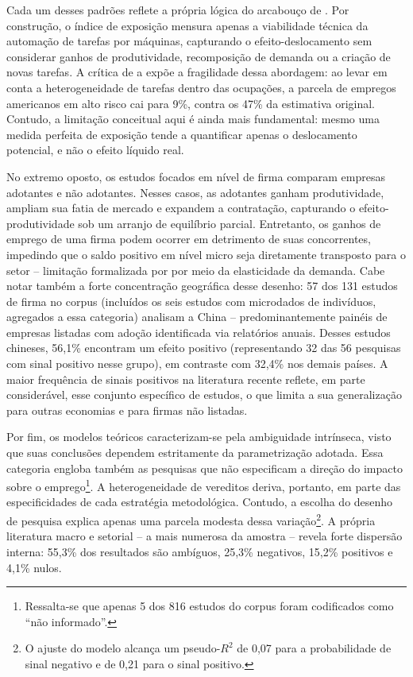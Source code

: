 Cada um desses padrões reflete a própria lógica do arcabouço de \textcite{acemogluRestrepo2019}. Por construção, o índice de exposição mensura apenas a viabilidade técnica da automação de tarefas por máquinas, capturando o efeito-deslocamento sem considerar ganhos de produtividade, recomposição de demanda ou a criação de novas tarefas. A crítica de \textcite{arntzGregoryZierahn2017} a \textcite{frey2017} expõe a fragilidade dessa abordagem: ao levar em conta a heterogeneidade de tarefas dentro das ocupações, a parcela de empregos americanos em alto risco cai para 9\%, contra os 47\% da estimativa original. Contudo, a limitação conceitual aqui é ainda mais fundamental: mesmo uma medida perfeita de exposição tende a quantificar apenas o deslocamento potencial, e não o efeito líquido real.

No extremo oposto, os estudos focados em nível de firma comparam empresas adotantes e não adotantes. Nesses casos, as adotantes ganham produtividade, ampliam sua fatia de mercado e expandem a contratação, capturando o efeito-produtividade sob um arranjo de equilíbrio parcial. Entretanto, os ganhos de emprego de uma firma podem ocorrer em detrimento de suas concorrentes, impedindo que o saldo positivo em nível micro seja diretamente transposto para o setor -- limitação formalizada por \textcite{bessen2018} por meio da elasticidade da demanda. Cabe notar também a forte concentração geográfica desse desenho: 57 dos 131 estudos de firma no corpus (incluídos os seis estudos com microdados de indivíduos, agregados a essa categoria) analisam a China -- predominantemente painéis de empresas listadas com adoção identificada via relatórios anuais. Desses estudos chineses, 56,1\% encontram um efeito positivo (representando 32 das 56 pesquisas com sinal positivo nesse grupo), em contraste com 32,4\% nos demais países. A maior frequência de sinais positivos na literatura recente reflete, em parte considerável, esse conjunto específico de estudos, o que limita a sua generalização para outras economias e para firmas não listadas.

Por fim, os modelos teóricos caracterizam-se pela ambiguidade intrínseca, visto que suas conclusões dependem estritamente da parametrização adotada. Essa categoria engloba também as pesquisas que não especificam a direção do impacto sobre o emprego\footnote{Ressalta-se que apenas 5 dos 816 estudos do corpus foram codificados como ``não informado''.}. A heterogeneidade de vereditos deriva, portanto, em parte das especificidades de cada estratégia metodológica. Contudo, a escolha do desenho de pesquisa explica apenas uma parcela modesta dessa variação\footnote{O ajuste do modelo alcança um pseudo-$R^2$ de 0,07 para a probabilidade de sinal negativo e de 0,21 para o sinal positivo.}. A própria literatura macro e setorial -- a mais numerosa da amostra -- revela forte dispersão interna: 55,3\% dos resultados são ambíguos, 25,3\% negativos, 15,2\% positivos e 4,1\% nulos.

